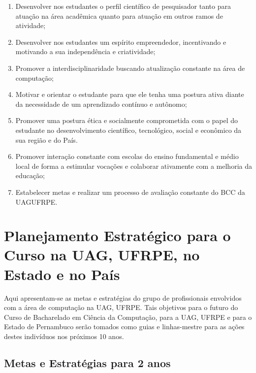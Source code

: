 \documentclass[
	12pt,				%
	openright,			%
  oneside,     %
	a4paper,			%
	english,			%
	french,				%
	spanish,			%
	brazil				%
	]{abntex2}
\begin{document}
\begin{enumerate}
  \item Desenvolver nos estudantes o perfil  científico de pesquisador tanto
  para atuação na área acadêmica quanto para atuação em outros ramos de atividade;
  \item Desenvolver nos estudantes um espírito  empreendedor, incentivando e
  motivando a sua independência e criatividade;
  \item Promover a interdisciplinaridade buscando  atualização constante na área
  de computação;
  \item Motivar e orientar o estudante para que ele  tenha uma postura ativa
  diante da necessidade de um aprendizado contínuo e autônomo;
  \item Promover uma postura ética e socialmente  comprometida com o papel do
  estudante no desenvolvimento científico, tecnológico,  social e econômico da
  sua região e do País.
  \item Promover interação constante com escolas do  ensino fundamental e médio
  local de forma a estimular vocações e colaborar ativamente com a melhoria da educação;
  \item Estabelecer metas e realizar um processo de avaliação constante do BCC
  da UAG\-UFRPE.
\end{enumerate}

\section*{Planejamento Estratégico para o Curso na UAG, UFRPE, no Estado e
no País}

Aqui apresentam-se as metas e estratégias do grupo de profissionais envolvidos com a área de
computação na UAG, UFRPE. Tais objetivos para o futuro do Curso de Bacharelado em
Ciência da Computação, para a UAG, UFRPE e para o Estado de Pernambuco serão tomados como
guias e linhas-mestre para as ações destes indivíduos nos próximos 10 anos.

\subsection*{Metas e Estratégias para 2 anos}
\end{document}
